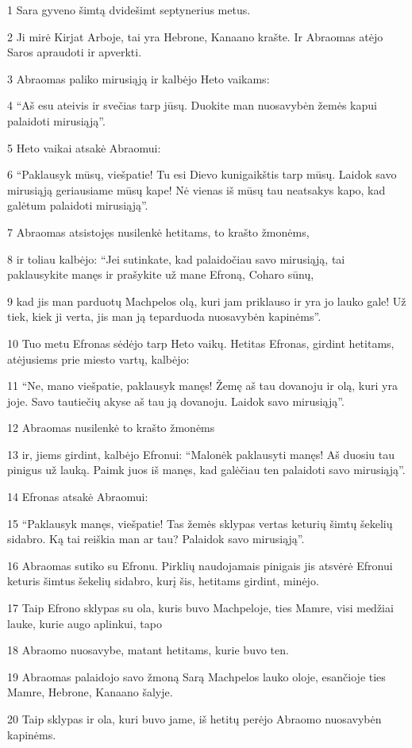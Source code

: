 \par 1 Sara gyveno šimtą dvidešimt septynerius metus. 
\par 2 Ji mirė Kirjat Arboje, tai yra Hebrone, Kanaano krašte. Ir Abraomas atėjo Saros apraudoti ir apverkti. 
\par 3 Abraomas paliko mirusiąją ir kalbėjo Heto vaikams: 
\par 4 “Aš esu ateivis ir svečias tarp jūsų. Duokite man nuosavybėn žemės kapui palaidoti mirusiąją”. 
\par 5 Heto vaikai atsakė Abraomui: 
\par 6 “Paklausyk mūsų, viešpatie! Tu esi Dievo kunigaikštis tarp mūsų. Laidok savo mirusiąją geriausiame mūsų kape! Nė vienas iš mūsų tau neatsakys kapo, kad galėtum palaidoti mirusiąją”. 
\par 7 Abraomas atsistojęs nusilenkė hetitams, to krašto žmonėms, 
\par 8 ir toliau kalbėjo: “Jei sutinkate, kad palaidočiau savo mirusiąją, tai paklausykite manęs ir prašykite už mane Efroną, Coharo sūnų, 
\par 9 kad jis man parduotų Machpelos olą, kuri jam priklauso ir yra jo lauko gale! Už tiek, kiek ji verta, jis man ją teparduoda nuosavybėn kapinėms”. 
\par 10 Tuo metu Efronas sėdėjo tarp Heto vaikų. Hetitas Efronas, girdint hetitams, atėjusiems prie miesto vartų, kalbėjo: 
\par 11 “Ne, mano viešpatie, paklausyk manęs! Žemę aš tau dovanoju ir olą, kuri yra joje. Savo tautiečių akyse aš tau ją dovanoju. Laidok savo mirusiąją”. 
\par 12 Abraomas nusilenkė to krašto žmonėms 
\par 13 ir, jiems girdint, kalbėjo Efronui: “Malonėk paklausyti manęs! Aš duosiu tau pinigus už lauką. Paimk juos iš manęs, kad galėčiau ten palaidoti savo mirusiąją”. 
\par 14 Efronas atsakė Abraomui: 
\par 15 “Paklausyk manęs, viešpatie! Tas žemės sklypas vertas keturių šimtų šekelių sidabro. Ką tai reiškia man ar tau? Palaidok savo mirusiąją”. 
\par 16 Abraomas sutiko su Efronu. Pirklių naudojamais pinigais jis atsvėrė Efronui keturis šimtus šekelių sidabro, kurį šis, hetitams girdint, minėjo. 
\par 17 Taip Efrono sklypas su ola, kuris buvo Machpeloje, ties Mamre, visi medžiai lauke, kurie augo aplinkui, tapo 
\par 18 Abraomo nuosavybe, matant hetitams, kurie buvo ten. 
\par 19 Abraomas palaidojo savo žmoną Sarą Machpelos lauko oloje, esančioje ties Mamre, Hebrone, Kanaano šalyje. 
\par 20 Taip sklypas ir ola, kuri buvo jame, iš hetitų perėjo Abraomo nuosavybėn kapinėms.



